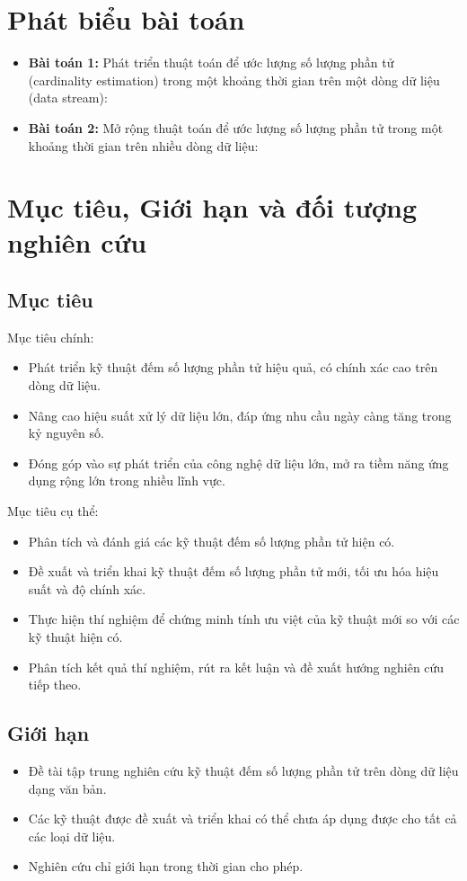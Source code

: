 \documentclass[letterpaper,13pt]{article}
\theoremstyle{mytheor}
\begin{document}
\section{Phát biểu bài toán}
\begin{itemize}
    \item \textbf{Bài toán 1:} Phát triển thuật toán để ước lượng số lượng phần tử (cardinality estimation) trong một khoảng thời gian trên một dòng dữ liệu (data stream):
    \item \textbf{Bài toán 2:} Mở rộng thuật toán để ước lượng số lượng phần tử trong một khoảng thời gian trên nhiều dòng dữ liệu:

\end{itemize}
\section{Mục tiêu, Giới hạn và đối tượng nghiên cứu }
\subsection{Mục tiêu}
Mục tiêu chính:
\begin{itemize}
    \item Phát triển kỹ thuật đếm số lượng phần tử hiệu quả, có chính xác cao trên dòng dữ liệu.
    \item Nâng cao hiệu suất xử lý dữ liệu lớn, đáp ứng nhu cầu ngày càng tăng trong kỷ nguyên số.
    \item Đóng góp vào sự phát triển của công nghệ dữ liệu lớn, mở ra tiềm năng ứng dụng rộng lớn trong nhiều lĩnh vực.
\end{itemize}
Mục tiêu cụ thể:
\begin{itemize}
    \item Phân tích và đánh giá các kỹ thuật đếm số lượng phần tử hiện có.
    \item Đề xuất và triển khai kỹ thuật đếm số lượng phần tử mới, tối ưu hóa hiệu suất và độ chính xác.
    \item Thực hiện thí nghiệm để chứng minh tính ưu việt của kỹ thuật mới so với các kỹ thuật hiện có.
    \item Phân tích kết quả thí nghiệm, rút ra kết luận và đề xuất hướng nghiên cứu tiếp theo.
\end{itemize}
\subsection{Giới hạn}
\begin{itemize}
    \item Đề tài tập trung nghiên cứu kỹ thuật đếm số lượng phần tử trên dòng dữ liệu dạng văn bản.
    \item Các kỹ thuật được đề xuất và triển khai có thể chưa áp dụng được cho tất cả các loại dữ liệu.
    \item Nghiên cứu chỉ giới hạn trong thời gian cho phép.
\end{itemize}
\end{document}
